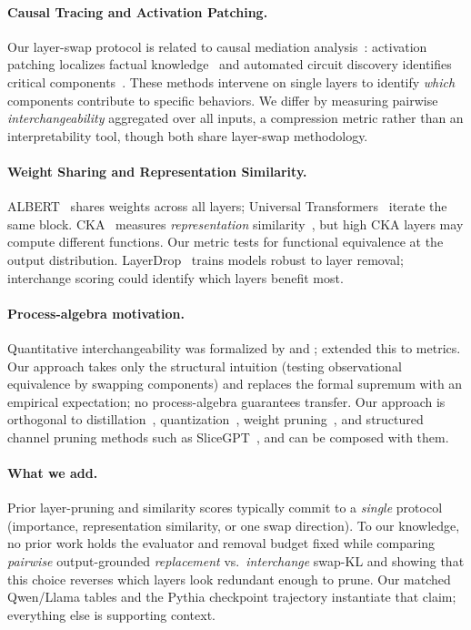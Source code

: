 \documentclass{article}
\begin{document}
\paragraph{Causal Tracing and Activation Patching.}
Our layer-swap protocol is related to causal mediation analysis~\citep{vig2020causal}: activation patching localizes factual knowledge~\citep{meng2022locating} and automated circuit discovery identifies critical components~\citep{conmy2023automated}. These methods intervene on single layers to identify \emph{which} components contribute to specific behaviors. We differ by measuring pairwise \emph{interchangeability} aggregated over all inputs, a compression metric rather than an interpretability tool, though both share layer-swap methodology.

\paragraph{Weight Sharing and Representation Similarity.}
ALBERT~\citep{lan2020albert} shares weights across all layers; Universal Transformers~\citep{dehghani2019universal} iterate the same block. CKA~\citep{kornblith2019similarity} measures \emph{representation} similarity~\citep{raghu2021vision}, but high CKA layers may compute different functions. Our metric tests for functional equivalence at the output distribution. LayerDrop~\citep{fan2020reducing} trains models robust to layer removal; interchange scoring could identify which layers benefit most.

\paragraph{Process-algebra motivation.}
Quantitative interchangeability was formalized by \citet{park1981concurrency} and \citet{milner1989communication}; \citet{desharnais2004metrics} extended this to metrics. Our approach takes only the structural intuition (testing observational equivalence by swapping components) and replaces the formal supremum with an empirical expectation; no process-algebra guarantees transfer. Our approach is orthogonal to distillation~\citep{hinton2015distilling}, quantization~\citep{frantar2023gptq}, weight pruning~\citep{frankle2019lottery}, and structured channel pruning methods such as SliceGPT~\citep{ashkboos2024slicegpt}, and can be composed with them.

\paragraph{What we add.}
Prior layer-pruning and similarity scores typically commit to a \emph{single} protocol (importance, representation similarity, or one swap direction). To our knowledge, no prior work holds the evaluator and removal budget fixed while comparing \emph{pairwise} output-grounded \emph{replacement} vs.\ \emph{interchange} swap-KL and showing that this choice reverses which layers look redundant enough to prune. Our matched Qwen/Llama tables and the Pythia checkpoint trajectory instantiate that claim; everything else is supporting context.
\end{document}
